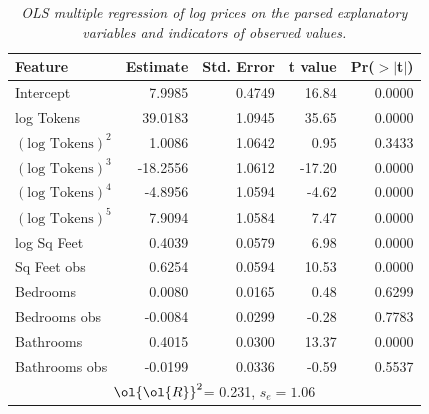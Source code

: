\documentclass[12pt]{article}
\newcommand{\prs}{\mbox{$\ol{\ol{R}}^2$}}
\begin{document}
 
 \begin{table}[ht]
\caption{ \label{tab:parsed} {\sl OLS multiple regression of log prices on the
 parsed explanatory variables and  indicators of observed values.}}
\centering
\begin{tabular}{lrrrr}
  \hline
    Feature       & Estimate & Std. Error & t value & Pr($>$$|$t$|$) \\ 
  \hline
  Intercept       & 7.9985 & 0.4749 & 16.84 & 0.0000 \\ 
  log Tokens      & 39.0183 & 1.0945 & 35.65 & 0.0000 \\ 
  $(\mbox{log Tokens})^2$   & 1.0086 & 1.0642 & 0.95 & 0.3433 \\ 
  $(\mbox{log Tokens})^3$ & -18.2556 & 1.0612 & -17.20 & 0.0000 \\ 
  $(\mbox{log Tokens})^4$ & -4.8956 & 1.0594 & -4.62 & 0.0000 \\ 
  $(\mbox{log Tokens})^5$ & 7.9094 & 1.0584 & 7.47 & 0.0000 \\ 
  log Sq Feet     & 0.4039 & 0.0579 & 6.98 & 0.0000 \\ 
  Sq Feet obs     & 0.6254 & 0.0594 & 10.53 & 0.0000 \\ 
  Bedrooms        & 0.0080 & 0.0165 & 0.48 & 0.6299 \\ 
  Bedrooms obs    & -0.0084 & 0.0299 & -0.28 & 0.7783 \\ 
  Bathrooms       & 0.4015 & 0.0300 & 13.37 & 0.0000 \\ 
  Bathrooms obs   & -0.0199 & 0.0336 & -0.59 & 0.5537 \\ 
   \hline
   \multicolumn{5}{c}{\prs = 0.231, \; $s_e = 1.06$}\\
   \hline
\end{tabular}
\end{table}

 
 
\end{document}

